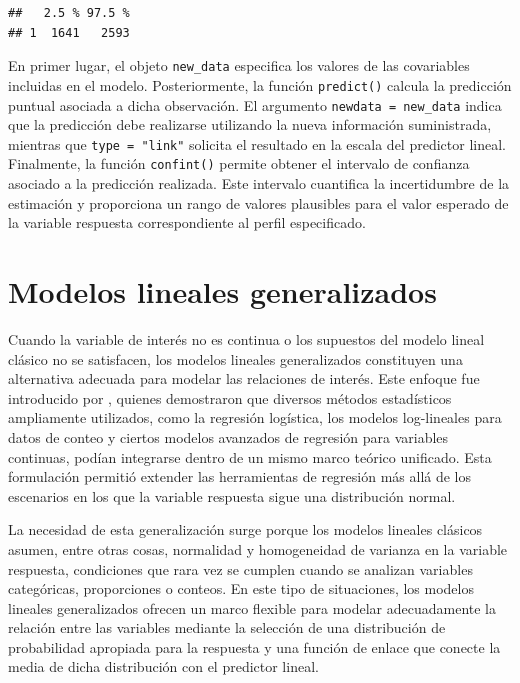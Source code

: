 \documentclass[
  spanish,
  12pt,
]{book}
\begin{document}
\begin{verbatim}
##   2.5 % 97.5 %
## 1  1641   2593
\end{verbatim}

En primer lugar, el objeto \texttt{new\_data} especifica los valores de las covariables incluidas en el modelo. Posteriormente, la función \texttt{predict()} calcula la predicción puntual asociada a dicha observación. El argumento \texttt{newdata\ =\ new\_data} indica que la predicción debe realizarse utilizando la nueva información suministrada, mientras que \texttt{type\ =\ "link"} solicita el resultado en la escala del predictor lineal. Finalmente, la función \texttt{confint()} permite obtener el intervalo de confianza asociado a la predicción realizada. Este intervalo cuantifica la incertidumbre de la estimación y proporciona un rango de valores plausibles para el valor esperado de la variable respuesta correspondiente al perfil especificado.

\chapter{Modelos lineales generalizados}\label{cap6}

Cuando la variable de interés no es continua o los supuestos del modelo lineal clásico no se satisfacen, los modelos lineales generalizados constituyen una alternativa adecuada para modelar las relaciones de interés. Este enfoque fue introducido por \citet{nelder1972generalized}, quienes demostraron que diversos métodos estadísticos ampliamente utilizados, como la regresión logística, los modelos log-lineales para datos de conteo y ciertos modelos avanzados de regresión para variables continuas, podían integrarse dentro de un mismo marco teórico unificado. Esta formulación permitió extender las herramientas de regresión más allá de los escenarios en los que la variable respuesta sigue una distribución normal.

La necesidad de esta generalización surge porque los modelos lineales clásicos asumen, entre otras cosas, normalidad y homogeneidad de varianza en la variable respuesta, condiciones que rara vez se cumplen cuando se analizan variables categóricas, proporciones o conteos. En este tipo de situaciones, los modelos lineales generalizados ofrecen un marco flexible para modelar adecuadamente la relación entre las variables mediante la selección de una distribución de probabilidad apropiada para la respuesta y una función de enlace que conecte la media de dicha distribución con el predictor lineal.
\end{document}
